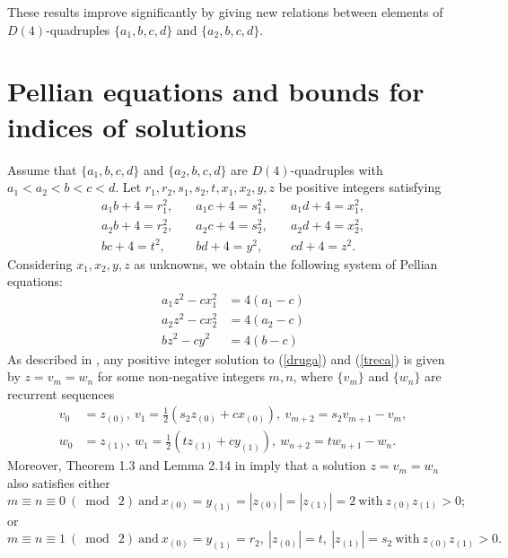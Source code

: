 \documentclass[12pt]{amsart}%
\theoremstyle{definition}
\theoremstyle{remark}
\theoremstyle{plain}
\begin{document}
These results improve \cite{mbtap1} significantly by giving new relations between elements of $D(4)$-quadruples $\{a_1,b,c,d\}$ and $\{a_2,b,c,d\}$.


\section{Pellian equations and bounds for indices of solutions}\label{sekcija_druga}
Assume that $ \{a_1,b,c,d\} $ and $ \{a_2,b,c,d\} $ are $D(4)$-quadruples with $a_1<a_2<b<c<d$. Let $r_1,r_2,s_1,s_2,t,x_1,x_2,y,z$ be positive integers satisfying 
$$
\begin{array}{lll}
    a_1b+4=r_1^2,  &\quad a_1c+4=s_1^2, & \quad a_1d+4=x_1^2,\\
    a_2b+4=r_2^2, &\quad a_2c+4=s_2^2, & \quad a_2d+4=x_2^2, \\
    bc+4=t^2, &\quad bd+4=y^2, & \quad cd+4=z^2.
\end{array}
$$
Considering $x_1,x_2,y,z$ as unknowns, we obtain the following system of Pellian equations:
\begin{align}
    a_1z^2-cx_1^2&=4(a_1-c) \label{prva} \\a_2z^2-cx_2^2&=4(a_2-c) \label{druga} \\
    bz^2-cy^2&=4(b-c) \label{treca}
\end{align}
As described in \cite{fil_xy4}, any positive integer solution to (\ref{druga}) and (\ref{treca}) is given by $z=v_m=w_n$ for some non-negative integers $m,n$, where $\{v_m\}$ and $\{w_n\}$ are recurrent sequences 
\begin{align}
    v_0&=z_{(0)}, \ v_1=\frac{1}{2}(s_2z_{(0)} + cx_{(0)}), \label{niz vm} \ v_{m+2}=s_2v_{m+1}-v_m, \\
    w_0&=z_{(1)}, \ w_1=\frac{1}{2}(tz_{(1)} + cy_{(1)}), \ w_{n+2}=tw_{n+1}-w_n.\label{niz wm}
\end{align}
Moreover, Theorem 1.3 and Lemma 2.14 in \cite{mbt} imply that a solution $z=v_m=w_n$ also satisfies either
\begin{equation}
     m \equiv n \equiv 0 \ (\bmod\ 2) \ \text{and}\ x_{(0)} = y_{(1)} = |z_{(0)}| = |z_{(1)}|=2 \ \text{with} \ z_{(0)}z_{(1)}>0; \label{rj_1} 
\end{equation}
or
\begin{equation}
     m \equiv n \equiv 1 \ (\bmod\ 2) \ \text{and}\ x_{(0)} = y_{(1)} = r_2, \ |z_{(0)}| = t, \ |z_{(1)}|=s_2 \ \text{with} \ z_{(0)}z_{(1)}>0.\label{rj_2}
\end{equation}
\end{document}
